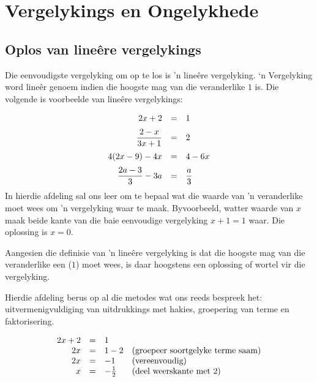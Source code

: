 \chapter{Vergelykings en Ongelykhede}
\setcounter{figure}{1}
\setcounter{subfigure}{1}

\section{Oplos van lineêre vergelykings}
\nopagebreak

           
Die eenvoudigste vergelyking om op te los is ’n lineêre vergelyking. ‘n Vergelyking word lineêr genoem indien
die hoogste mag van die veranderlike $1$ is. Die volgende is voorbeelde van lineêre
vergelykings:\par 


\begin{equation*}
\begin{array}{ccl}\hfill 2x+2& =& 1\hfill \vspace{6pt} \\
 \hfill \dfrac{2-x}{3x+1}& =& 2\hfill \vspace{6pt} \\
\hfill 4(2x-9)-4x&=&4-6x \hfill  \vspace{6pt}\\ 
\hfill \dfrac{2a-3}{3}-3a&=&\dfrac{a}{3} \hfill\\
\end{array}
\end{equation*}
In hierdie afdeling sal ons leer om te bepaal wat die waarde van ’n veranderlike moet wees om ’n vergelyking waar
te maak. Byvoorbeeld, watter waarde van $x$ maak beide kante van die baie eenvoudige vergelyking $x+1=1$ waar. Die oplossing is $x=0$.\par 
Aangesien die definisie van ’n lineêre vergelyking is dat die hoogste mag van die veranderlike een ($1$) moet wees,
is daar hoogstens een oplossing of wortel vir die vergelyking.\par 
Hierdie afdeling berus op al die metodes wat ons reeds bespreek het: uitvermenigvuldiging van uitdrukkings met
hakies, groepering van terme en faktorisering.\par 

\begin{equation*}
  \begin{array}{ccll}\hfill 2x+2& =& 1\hfill \\ 
      \hfill 2x& =& 1-2\hfill & \mbox{(groepeer soortgelyke terme saam)}\hfill \\ 
      \hfill 2x& =& -1\hfill & \mbox{(vereenvoudig)}\hfill \\
\hfill x&=& -\frac{1}{2} & \mbox{(deel weerskante met $2$)} \hfill
  \end{array}
\end{equation*}


